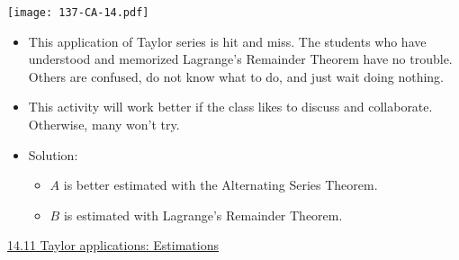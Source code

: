 \documentclass[11pt]{article}
\newcommand{\nl}{\hfill \vspace{-1.1\baselineskip}} %
\newcommand{\vxi}{\hspace{8mm}  \href{https://www.youtube.com/watch?v=vM7sLZ2ljko&list=PLlwePzQY_wW9h32ZwS6CYsY4eR_b2pE9j&index=11}{14.11 Taylor applications: Estimations}}
\begin{document}
\begin{center}
{ \texttt{[image: 137-CA-14.pdf]}} 
\end{center}

\begin{comments}
\nl
	\begin{itemize}
		\item This application of Taylor series is hit and miss.  The students who have understood and memorized Lagrange's Remainder Theorem have no trouble.  Others are confused, do not know what to do, and just wait doing nothing.
		
		\item This activity will work better if the class likes to discuss and collaborate.  Otherwise, many won't try.
		
		\item Solution:  
			\begin{itemize}
				\item  $A$ is better estimated with the Alternating Series Theorem.
				\item  $B$ is estimated with Lagrange's Remainder Theorem.
			\end{itemize}
	\end{itemize}
\end{comments}

\begin{videos}
\vxi
\end{videos}

\newpage
\end{document}
